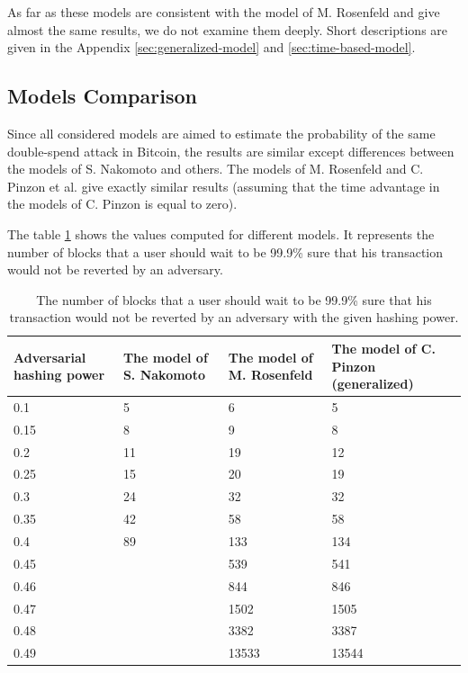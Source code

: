 \documentclass[10pt,a4paper]{article}
\numberwithin{equation}{section} %
\theoremstyle{plain}
\theoremstyle{definition}
\theoremstyle{remark}
\begin{document}
	As far as these models are consistent with the model of M. Rosenfeld and give almost the same results, we do not examine them deeply. Short descriptions are given in the Appendix \ref{sec:generalized-model} and \ref{sec:time-based-model}.
	
	\subsection{Models Comparison}
	
	Since all considered models are aimed to estimate the probability of the same double-spend attack in Bitcoin, the results are similar except differences between the models of S. Nakomoto and others. The models of M. Rosenfeld and C. Pinzon et al. give exactly similar results (assuming that the time advantage in the models of C. Pinzon is equal to zero).
	
	The table \ref{tbl:bitcoin_comparison} shows the values computed for different models. It represents the number of blocks that a user should wait to be 99.9\% sure that his transaction would not be reverted by an adversary.
	\begin{table}[h!]
        \label{tbl:bitcoin_comparison}
        \centering
    \begin{tabular}{|p{2cm}||p{2cm}|p{2cm}|p{2cm}|}
         \hline 
         Adversarial hashing power & The model of S. Nakomoto & The model of M. Rosenfeld & The model of C. Pinzon (generalized) \\
         \hline
         0.1   & 5  & 6     & 5 \\
         0.15  & 8  & 9     & 8 \\
         0.2   & 11 & 19    & 12 \\
         0.25  & 15 & 20    & 19 \\
         0.3   & 24 & 32    & 32 \\
         0.35  & 42 & 58    & 58 \\
         0.4   & 89 & 133   & 134 \\
         0.45  &    & 539   & 541 \\
         0.46  &    & 844   & 846 \\
         0.47  &    & 1502  & 1505 \\
         0.48  &    & 3382  & 3387 \\
         0.49  &    & 13533 & 13544 \\
         \hline
    \end{tabular}
    \caption{The number of blocks that a user should wait to be 99.9\% sure that his transaction would not be reverted by an adversary with the given hashing power.}
    \end{table}
	
\end{document}
